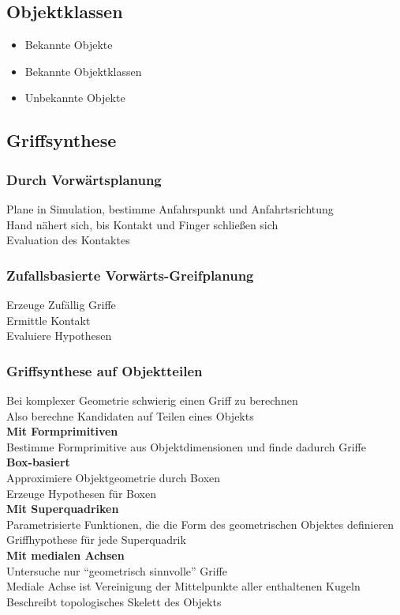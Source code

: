 \subsection{Objektklassen}
\begin{itemize}
\item Bekannte Objekte
\item Bekannte Objektklassen
\item Unbekannte Objekte
\end{itemize}

\subsection{Griffsynthese}
\subsubsection{Durch Vorwärtsplanung}
Plane in Simulation, bestimme Anfahrspunkt und Anfahrtsrichtung\\
Hand nähert sich, bis Kontakt und Finger schließen sich\\
Evaluation des Kontaktes\\


\subsubsection{Zufallsbasierte Vorwärts-Greifplanung}
Erzeuge Zufällig Griffe\\
Ermittle Kontakt\\
Evaluiere Hypothesen\\

\subsubsection{Griffsynthese auf Objektteilen}
Bei komplexer Geometrie schwierig einen Griff zu berechnen\\
Also berechne Kandidaten auf Teilen eines Objekts\\

\textbf{Mit Formprimitiven}\\
Bestimme Formprimitive aus Objektdimensionen und finde dadurch Griffe\\

\textbf{Box-basiert}\\
Approximiere Objektgeometrie durch Boxen\\
Erzeuge Hypothesen für Boxen\\

\textbf{Mit Superquadriken}\\
Parametrisierte Funktionen, die die Form des geometrischen Objektes definieren\\
Griffhypothese für jede Superquadrik\\

\textbf{Mit medialen Achsen}\\
Untersuche nur \enquote{geometrisch sinnvolle} Griffe\\
Mediale Achse ist Vereinigung der Mittelpunkte aller enthaltenen Kugeln\\
Beschreibt topologisches Skelett des Objekts\\


